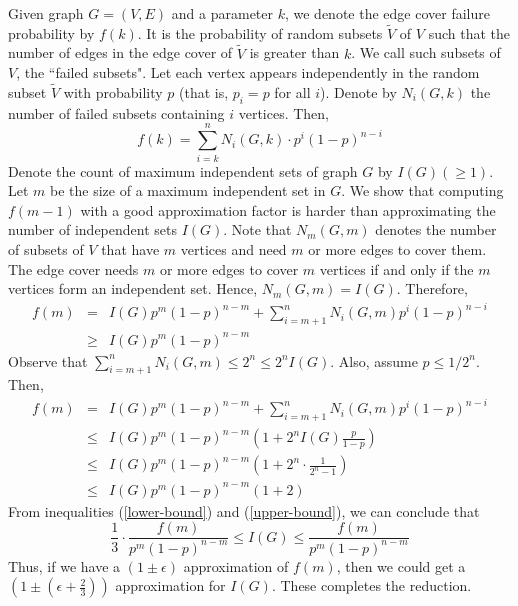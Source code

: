 \documentclass[11pt,onecolumn]{article}
\begin{document}
Given graph $G=(V,E)$ and a parameter $k$, we denote the edge cover failure probability by $f(k)$. It is the probability of random subsets $\tilde{V}$ of $V$ such that the number of edges in the edge cover of $\tilde{V}$ is greater than $k$. We call such subsets of $V$, the ``failed subsets". Let each vertex 
appears independently in the random subset $\tilde{V}$ with probability $p$ (that is, $p_i=p$ for all $i$). 
Denote by $N_i(G,k)$ the number of failed subsets containing $i$ vertices. Then,
$$f(k)=\sum_{i=k}^n N_i(G,k) \cdot p^{i} (1-p)^{n-i} $$
Denote the count of maximum independent sets of graph $G$ by $I(G) (\ge 1)$. 
 Let $m$ be the size of a maximum independent set in $G$.
We show that computing $f(m-1)$ with a good approximation factor is harder 
than approximating the number of independent sets $I(G)$. Note that $N_m(G,m)$ denotes the number of subsets of $V$ that have $m$ vertices and need $m$ or 
more edges to cover them. The edge cover needs $m$ or more edges to cover $m$
vertices if and only if the $m$ vertices form an independent set. Hence, 
$N_m(G,m) = I(G)$. Therefore,
\begin{eqnarray}
\label{lower-bound}
f(m) & = & I(G)p^m (1-p)^{n-m} + \sum_{i=m+1}^n N_i(G,m) p^{i} (1-p)^{n-i} \nonumber\\ 
& \ge & I(G)p^m (1-p)^{n-m}
\end{eqnarray}
Observe that $\sum_{i=m+1}^n N_i(G,m) \le 2^n \le 2^n I(G)$. Also, assume 
$p\le1/2^n$. Then,
\begin{eqnarray}
\label{upper-bound}
f(m) & = & I(G)p^m (1-p)^{n-m} + \sum_{i=m+1}^n N_i(G,m) p^{i} (1-p)^{n-i} \nonumber\\
& \le & I(G) p^m (1-p)^{n-m} (1+ 2^n I(G)\frac{p}{1-p}) \nonumber\\
& \le & I(G) p^m (1-p)^{n-m} ( 1+ 2^n \cdot \frac{1}{2^n-1}) \nonumber\\
& \le & I(G) p^m (1-p)^{n-m} (1+2)
\end{eqnarray}
From inequalities (\ref{lower-bound}) and (\ref{upper-bound}), we can conclude that 
\[\frac{1}{3} \cdot \frac{f(m)}{p^m (1-p)^{n-m}} \le I(G) \le \frac{f(m)}{p^m (1-p)^{n-m}}\]
Thus, if we have a $(1\pm \epsilon)$ approximation of $f(m)$, then we could
get a $(1\pm (\epsilon+\frac{2}{3}))$ approximation for $I(G)$. These completes the reduction.






\end{document}
